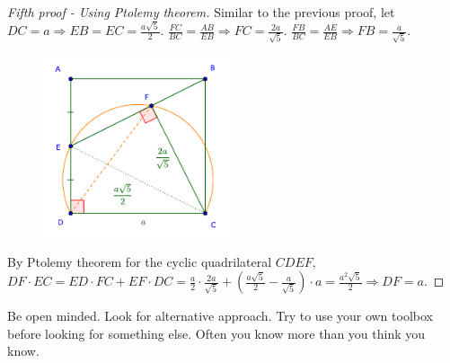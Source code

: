 \documentclass{article}
\begin{document}
\begin{proof}[Fifth proof - Using Ptolemy theorem]
    Similar to the previous proof,
    let $DC = a \Rightarrow EB = EC = \frac{a\sqrt{5}}{2}.$ 
    $\frac{FC}{BC} = \frac{AB}{EB} \Rightarrow FC=\frac{2a}{\sqrt{5}}.$
    $\frac{FB}{BC} = \frac{AE}{EB} \Rightarrow FB=\frac{a}{\sqrt{5}}.$

    \begin{figure}[h]
        \centering
        \begin{minipage}[t]{8cm}
            \centering
            \includegraphics[width=5.5cm]{./svg/pdf/2022-2-ms-1-1-i.pdf}
        \end{minipage}
    \end{figure}

    By Ptolemy theorem for the cyclic quadrilateral $CDEF,$
    $DF \cdot EC = ED \cdot FC + EF \cdot DC 
    = \frac{a}{2}\cdot \frac{2a}{\sqrt{5}} + \left(\frac{a\sqrt{5}}{2} - \frac{a}{\sqrt{5}} \right) \cdot a
    = \frac{a^2\sqrt{5}}{2} \Rightarrow DF = a.$
\end{proof}

Be open minded. Look for alternative approach. Try to use your own toolbox before looking for something else.
Often you know more than you think you know.
\end{document}
